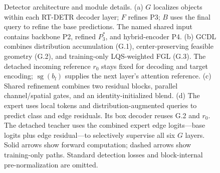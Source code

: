 \begin{figure}[t]
\centering
\visualOverview{\textwidth}
\caption{Detector architecture and module details. (a) $G$ localizes objects within each RT-DETR decoder layer; $F$ refines P3; $B$ uses the final query to refine the base predictions. The named shared input contains backbone P2, refined $P_3^{*}$, and hybrid-encoder P4. (b) GCDL combines distribution accumulation (G.1), center-preserving feasible geometry (G.2), and training-only LQS-weighted FGL (G.3). The detached incoming reference $r_0$ stays fixed for decoding and target encoding; $\operatorname{sg}(b_l)$ supplies the next layer's attention reference. (c) Shared refinement combines two residual blocks, parallel channel/spatial gates, and an identity-initialized blend. (d) The expert uses local tokens and distribution-augmented queries to predict class and edge residuals. Its box decoder reuses G.2 and $r_0$. The detached teacher uses the combined expert edge logits---base logits plus edge residual---to selectively supervise all six $G$ layers. Solid arrows show forward computation; dashed arrows show training-only paths. Standard detection losses and block-internal pre-normalization are omitted.}
\label{fig:overview}\label{fig:lrs}\label{fig:expert}\label{fig:selection}
\end{figure}
